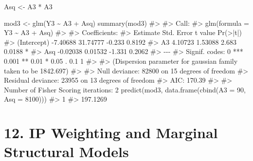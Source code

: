 \documentclass[
  10pt,
  a4paper,
]{book}
\newenvironment{Shaded}{\begin{snugshade}}{\end{snugshade}}
\newcommand{\AttributeTok}[1]{\textcolor[rgb]{0.40,0.45,0.13}{#1}}
\newcommand{\CommentTok}[1]{\textcolor[rgb]{0.37,0.37,0.37}{#1}}
\newcommand{\DecValTok}[1]{\textcolor[rgb]{0.68,0.00,0.00}{#1}}
\newcommand{\FunctionTok}[1]{\textcolor[rgb]{0.28,0.35,0.67}{#1}}
\newcommand{\NormalTok}[1]{\textcolor[rgb]{0.00,0.46,0.62}{#1}}
\newcommand{\OtherTok}[1]{\textcolor[rgb]{0.00,0.46,0.62}{#1}}
\newcommand{\SpecialCharTok}[1]{\textcolor[rgb]{0.37,0.37,0.37}{#1}}
\begin{document}
\begin{Shaded}
\begin{Highlighting}[]
\NormalTok{Asq }\OtherTok{\textless{}{-}}\NormalTok{ A3 }\SpecialCharTok{*}\NormalTok{ A3}

\NormalTok{mod3 }\OtherTok{\textless{}{-}} \FunctionTok{glm}\NormalTok{(Y3 }\SpecialCharTok{\textasciitilde{}}\NormalTok{ A3 }\SpecialCharTok{+}\NormalTok{ Asq)}
\FunctionTok{summary}\NormalTok{(mod3)}
\CommentTok{\#\textgreater{} }
\CommentTok{\#\textgreater{} Call:}
\CommentTok{\#\textgreater{} glm(formula = Y3 \textasciitilde{} A3 + Asq)}
\CommentTok{\#\textgreater{} }
\CommentTok{\#\textgreater{} Coefficients:}
\CommentTok{\#\textgreater{}             Estimate Std. Error t value Pr(\textgreater{}|t|)  }
\CommentTok{\#\textgreater{} (Intercept) {-}7.40688   31.74777  {-}0.233   0.8192  }
\CommentTok{\#\textgreater{} A3           4.10723    1.53088   2.683   0.0188 *}
\CommentTok{\#\textgreater{} Asq         {-}0.02038    0.01532  {-}1.331   0.2062  }
\CommentTok{\#\textgreater{} {-}{-}{-}}
\CommentTok{\#\textgreater{} Signif. codes:  0 \textquotesingle{}***\textquotesingle{} 0.001 \textquotesingle{}**\textquotesingle{} 0.01 \textquotesingle{}*\textquotesingle{} 0.05 \textquotesingle{}.\textquotesingle{} 0.1 \textquotesingle{} \textquotesingle{} 1}
\CommentTok{\#\textgreater{} }
\CommentTok{\#\textgreater{} (Dispersion parameter for gaussian family taken to be 1842.697)}
\CommentTok{\#\textgreater{} }
\CommentTok{\#\textgreater{}     Null deviance: 82800  on 15  degrees of freedom}
\CommentTok{\#\textgreater{} Residual deviance: 23955  on 13  degrees of freedom}
\CommentTok{\#\textgreater{} AIC: 170.39}
\CommentTok{\#\textgreater{} }
\CommentTok{\#\textgreater{} Number of Fisher Scoring iterations: 2}
\FunctionTok{predict}\NormalTok{(mod3, }\FunctionTok{data.frame}\NormalTok{(}\FunctionTok{cbind}\NormalTok{(}\AttributeTok{A3 =} \DecValTok{90}\NormalTok{, }\AttributeTok{Asq =} \DecValTok{8100}\NormalTok{)))}
\CommentTok{\#\textgreater{}        1 }
\CommentTok{\#\textgreater{} 197.1269}
\end{Highlighting}
\end{Shaded}

\chapter*{12. IP Weighting and Marginal Structural Models}\label{ip-weighting-and-marginal-structural-models}
\end{document}
